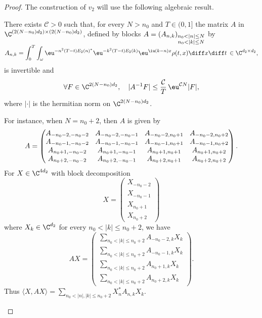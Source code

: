 \begin{proof}
The construction of $v_2$ will use the following algebraic result.
\begin{lemma} \label{Prop:ANinv}
There exists $\mathcal{C}>0$ such that, for every $N>n_0$ and $T\in(0,1]$
the matrix $A$ in $\C^{(2(N-n_0)d_2)\times(2(N-n_0)d_2)}$, defined by blocks
$A=(A_{n,k})_{\smash[b]{\substack{n_0 < |n|\leq N\\ n_0 < |k| \leq N}}}$ by
\[
A_{n,k}=\int_0^T \int_{\omega} \eu^{-n^2(T-t)E_2(n)^*} \eu^{-k^2(T-t)E_2(k)} \eu^{\iu(k-n)x} \rho(t,x) \diff x \diff t\, \in \C^{d_2\times d_2},
\]
is invertible and
\[
\forall F\in\C^{2(N-n_0)d_2}, \quad |A^{-1} F| \leq \frac{\mathcal{C}}{T}\, \eu^{\mathcal{C} N} |F|,
\]
where $|\cdot|$ is the hermitian norm on $\C^{2(N-n_0)d_2}$.
\end{lemma}

\begin{remark}
For instance, when $N=n_0+2$, then $A$ is given by
\[\arraycolsep4.5pt
A=\begin{pmatrix}
A_{-n_0-2,-n_0-2} & A_{-n_0-2,-n_0-1} & A_{-n_0-2,n_0+1} & A_{-n_0-2,n_0+2} \\
A_{-n_0-1,-n_0-2} & A_{-n_0-1,-n_0-1} & A_{-n_0-1,n_0+1} & A_{-n_0-1,n_0+2} \\
A_{n_0+1,-n_0-2} & A_{n_0+1,-n_0-1} & A_{n_0+1,n_0+1} & A_{n_0+1,n_0+2}
\\
A_{n_0+2,-n_0-2} & A_{n_0+2,-n_0-1} & A_{n_0+2,n_0+1} & A_{n_0+2,n_0+2}
\end{pmatrix}.
\]
For $X \in \C^{4d_2}$ with block decomposition
\[
X=\begin{pmatrix}
X_{-n_0-2} \\ X_{-n_0-1} \\ X_{n_0+1} \\ X_{n_0+2}
\end{pmatrix}
\]
where $X_k \in \C^{d_2}$ for every $n_0 < |k| \leq n_0+2$,
we have
\[
AX=\begin{pmatrix}
\sum_{n_0<|k|\leq n_0+2} A_{-n_0-2,k} X_{k} \\
\sum_{n_0<|k|\leq n_0+2} A_{-n_0-1,k} X_{k} \\
\sum_{n_0<|k|\leq n_0+2} A_{n_0+1,k} X_{k} \\
\sum_{n_0<|k|\leq n_0+2} A_{n_0+2,k} X_{k}
\end{pmatrix}.
\]
Thus $\langle X, AX \rangle = \sum_{n_0 < |n|,|k|\leq n_0+2} X_n^* A_{n,k} X_k$.
\end{remark}


\end{proof}
